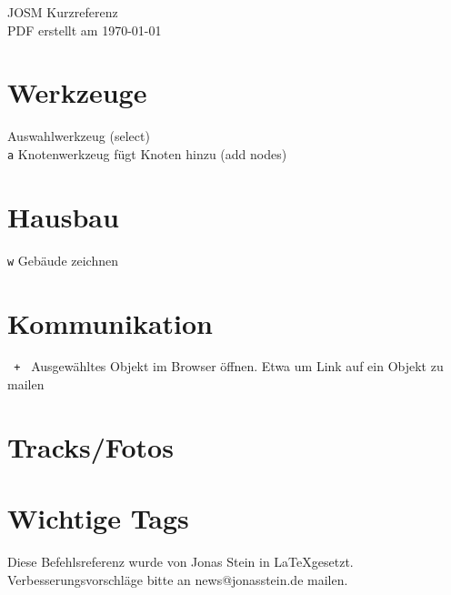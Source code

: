 \documentclass[a4paper,11pt,notumble]{leaflet}
\newcommand{\Key}[2]{{\tt #1} {#2}\\[2mm]}
\begin{document}
 
{\Huge JOSM Kurzreferenz}\\
{\small PDF erstellt am \today}

\section*{Werkzeuge}
\Key{}{Auswahlwerkzeug (select)}
\Key{a}{Knotenwerkzeug fügt Knoten hinzu (add nodes)}

\section*{Hausbau}
\Key{w}{Gebäude zeichnen}

\section*{Kommunikation}
\Key{ + }{Ausgewähltes Objekt im Browser öffnen. Etwa um Link auf ein Objekt zu mailen}

\section*{Tracks/Fotos}



\newpage
\section*{Wichtige Tags}

\newpage
Diese Befehlsreferenz wurde von Jonas Stein in \LaTeX gesetzt.
Verbesserungsvorschläge bitte an news@jonasstein.de mailen.
\end{document}
